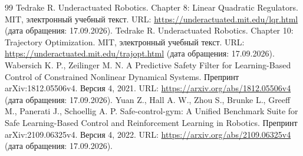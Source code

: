 \begin{thebibliography}{99}
 Tedrake R. Underactuated Robotics. Chapter 8: Linear Quadratic Regulators. MIT, электронный учебный текст. URL: \url{https://underactuated.mit.edu/lqr.html} (дата обращения: 17.09.2026).
 Tedrake R. Underactuated Robotics. Chapter 10: Trajectory Optimization. MIT, электронный учебный текст. URL: \url{https://underactuated.mit.edu/trajopt.html} (дата обращения: 17.09.2026).
 Wabersich K. P., Zeilinger M. N. A Predictive Safety Filter for Learning-Based Control of Constrained Nonlinear Dynamical Systems. Препринт arXiv:1812.05506v4. Версия 4, 2021. URL: \url{https://arxiv.org/abs/1812.05506v4} (дата обращения: 17.09.2026).
 Yuan Z., Hall A. W., Zhou S., Brunke L., Greeff M., Panerati J., Schoellig A. P. Safe-control-gym: A Unified Benchmark Suite for Safe Learning-Based Control and Reinforcement Learning in Robotics. Препринт arXiv:2109.06325v4. Версия 4, 2022. URL: \url{https://arxiv.org/abs/2109.06325v4} (дата обращения: 17.09.2026).
\end{thebibliography}
